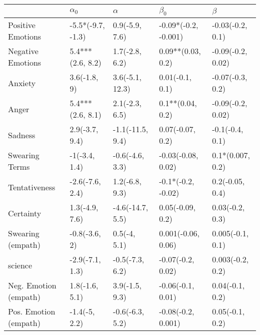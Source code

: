 \begin{tabular}{lllll}
\toprule
{} &         $\alpha_0$ &          $\alpha$ &             $\beta_0$ &            $\beta$ \\
\midrule
Positive Emotions     &  -5.5*(-9.7, -1.3) &    0.9(-5.9, 7.6) &  -0.09*(-0.2, -0.001) &   -0.03(-0.2, 0.1) \\
Negative Emotions     &   5.4***(2.6, 8.2) &    1.7(-2.8, 6.2) &     0.09**(0.03, 0.2) &  -0.09(-0.2, 0.02) \\
Anxiety               &       3.6(-1.8, 9) &   3.6(-5.1, 12.3) &       0.01(-0.1, 0.1) &   -0.07(-0.3, 0.2) \\
Anger                 &   5.4***(2.6, 8.1) &    2.1(-2.3, 6.5) &      0.1**(0.04, 0.2) &  -0.09(-0.2, 0.02) \\
Sadness               &     2.9(-3.7, 9.4) &  -1.1(-11.5, 9.4) &      0.07(-0.07, 0.2) &    -0.1(-0.4, 0.1) \\
Swearing Terms        &      -1(-3.4, 1.4) &   -0.6(-4.6, 3.3) &    -0.03(-0.08, 0.02) &   0.1*(0.007, 0.2) \\
Tentativeness         &    -2.6(-7.6, 2.4) &    1.2(-6.8, 9.3) &    -0.1*(-0.2, -0.02) &    0.2(-0.05, 0.4) \\
Certainty             &     1.3(-4.9, 7.6) &  -4.6(-14.7, 5.5) &      0.05(-0.09, 0.2) &    0.03(-0.2, 0.3) \\
Swearing (empath)     &      -0.8(-3.6, 2) &      0.5(-4, 5.1) &    0.001(-0.06, 0.06) &   0.005(-0.1, 0.1) \\
science               &    -2.9(-7.1, 1.3) &   -0.5(-7.3, 6.2) &     -0.07(-0.2, 0.02) &   0.003(-0.2, 0.2) \\
Neg. Emotion (empath) &     1.8(-1.6, 5.1) &    3.9(-1.5, 9.3) &     -0.06(-0.1, 0.01) &    0.04(-0.1, 0.2) \\
Pos. Emotion (empath) &      -1.4(-5, 2.2) &   -0.6(-6.3, 5.2) &    -0.08(-0.2, 0.001) &    0.05(-0.1, 0.2) \\
\bottomrule
\end{tabular}
